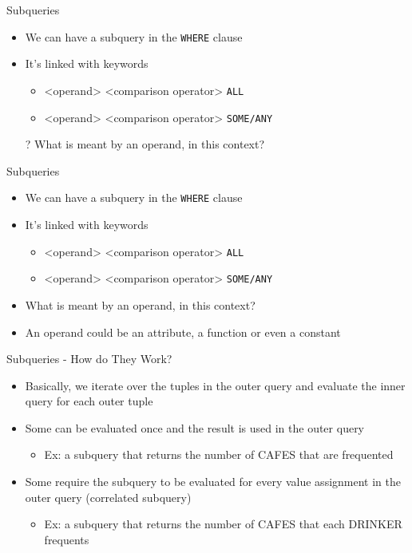\documentclass[aspectratio=169]{beamer}
\begin{document}
\begin{frame}{Subqueries}

\begin{itemize}
\item We can have a subquery in the \texttt{WHERE} clause
\item It's linked with keywords
	\begin{itemize}
	\item {<operand>} <comparison operator> \texttt{ALL}
	\item {<operand>} <comparison operator> \texttt{SOME/ANY}
	\end{itemize}
	
\item[?] What is meant by an operand, in this context?
\end{itemize}
\end{frame}
\begin{frame}{Subqueries}

\begin{itemize}
\item We can have a subquery in the \texttt{WHERE} clause
\item It's linked with keywords
	\begin{itemize}
	\item {<operand>} <comparison operator> \texttt{ALL}
	\item {<operand>} <comparison operator> \texttt{SOME/ANY}
	\end{itemize}
	
\item What is meant by an operand, in this context?
\item An operand could be an attribute, a function or even a constant
\end{itemize}
\end{frame}


\begin{frame}{Subqueries - How do They Work?}

\begin{itemize}
\item Basically, we iterate over the tuples in the outer query and evaluate the inner query for each outer tuple
\item Some can be evaluated once and the result is used in the outer query
	\begin{itemize}
	\item Ex: a subquery that returns the number of CAFES that are frequented
	\end{itemize}

\item Some require the subquery to be evaluated for every value assignment in the outer query (correlated subquery)
	\begin{itemize}
	\item Ex: a subquery that returns the number of CAFES that each  DRINKER frequents
	\end{itemize}

\end{itemize}
\end{frame}
\end{document}

